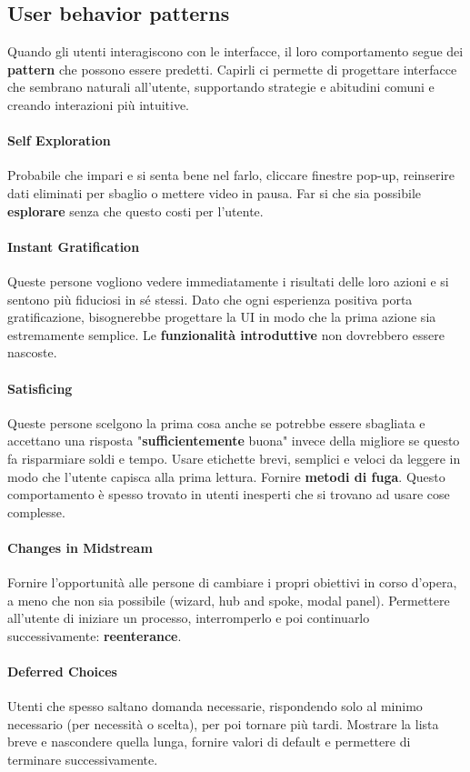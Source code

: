 \subsection{User behavior patterns}
Quando gli utenti interagiscono con le interfacce, il loro comportamento segue dei \textbf{pattern} che possono essere predetti. Capirli ci permette di progettare interfacce che sembrano naturali all'utente, supportando strategie e abitudini comuni e creando interazioni più intuitive.
\paragraph{Self Exploration} Probabile che impari e si senta bene nel farlo, cliccare finestre pop-up, reinserire dati eliminati per sbaglio o mettere video in pausa. Far si che sia possibile \textbf{esplorare} senza che questo costi per l'utente.
\paragraph{Instant Gratification} Queste persone vogliono vedere immediatamente i risultati delle loro azioni e si sentono più fiduciosi in sé stessi. Dato che ogni esperienza positiva porta gratificazione, bisognerebbe progettare la UI in modo che la prima azione sia estremamente semplice. Le \textbf{funzionalità introduttive} non dovrebbero essere nascoste.
\paragraph{Satisficing} Queste persone scelgono la prima cosa anche se potrebbe essere sbagliata e accettano una risposta "\textbf{sufficientemente} buona" invece della migliore se questo fa risparmiare soldi e tempo. Usare etichette brevi, semplici e veloci da leggere in modo che l'utente capisca alla prima lettura. Fornire \textbf{metodi di fuga}. Questo comportamento è spesso trovato in utenti inesperti che si trovano ad usare cose complesse.
\paragraph{Changes in Midstream} Fornire l'opportunità alle persone di cambiare i propri obiettivi in corso d'opera, a meno che non sia possibile (wizard, hub and spoke, modal panel). Permettere all'utente di iniziare un processo, interromperlo e poi continuarlo successivamente: \textbf{reenterance}.
\paragraph{Deferred Choices} Utenti che spesso saltano domanda necessarie, rispondendo solo al minimo necessario (per necessità o scelta), per poi tornare più tardi. Mostrare la lista breve e nascondere quella lunga, fornire valori di default e permettere di terminare successivamente.
